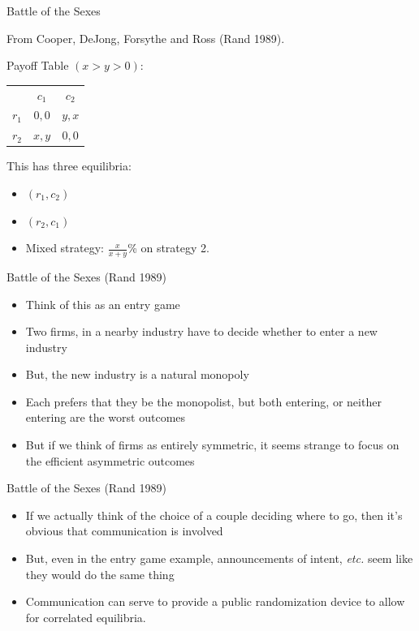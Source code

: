 \documentclass{beamer}
\begin{document}
\begin{frame}{Battle of the Sexes}
\begin{card}
From Cooper, DeJong, Forsythe and Ross (Rand 1989).
\begin{center}
Payoff Table $(x>y>0)$:

		\begin{tabular}{r|c|c|}
				\multicolumn{1}{r}{}& \multicolumn{1}{c}{$c_1$}  & \multicolumn{1}{c}{$c_2$} \\ \cline{2-3}
				$r_1$ &  $0,0$ & $y,x$ \\ \cline{2-3}
				$r_2$ &  $x,y$ & $0,0$ \\ \cline{2-3}
				\end{tabular}
\end{center}
\end{card}
	\begin{card}
This has three equilibria:
			\begin{itemize}
				\item $(r_1,c_2)$
				\item $(r_2,c_1)$
				\item Mixed strategy: $\tfrac{x}{x+y}$\% on strategy 2.
			\end{itemize}
	\end{card}
\end{frame}

\begin{frame}{Battle of the Sexes (Rand 1989)}
\begin{card}
	\begin{itemize}
		\item Think of this as an entry game
		\item Two firms, in a nearby industry have to decide whether to enter a new industry
		\item But, the new industry is a natural monopoly
		\item Each prefers that they be the monopolist, but both entering, or neither entering are the worst outcomes
		\item But if we think of firms as entirely symmetric, it seems strange to focus on the efficient asymmetric outcomes
	\end{itemize}
\end{card}
\end{frame}

\begin{frame}{Battle of the Sexes (Rand 1989)}
\begin{card}
	\begin{itemize}
		\item If we actually think of the choice of a couple deciding where to go, then it's obvious that communication is involved 
		\item But, even in the entry game example, announcements of intent, \emph{etc.} seem like they would do the same thing \pause
		\item Communication can serve to provide a public randomization device to allow for correlated equilibria.
	\end{itemize}
\end{card}	
\end{frame}
\end{document}
